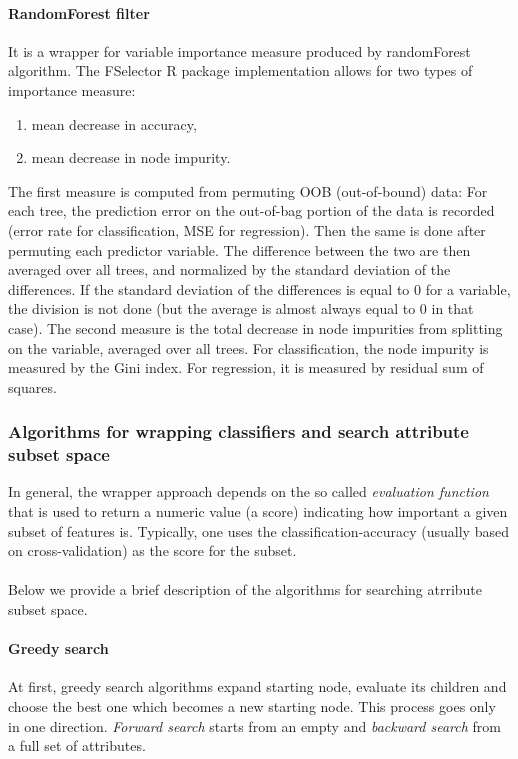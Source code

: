 \documentclass[10pt]{article}\usepackage[]{graphicx}\usepackage[]{color}
\begin{document}
\paragraph{RandomForest filter}
It is a wrapper for variable importance measure produced by randomForest algorithm. The FSelector R package implementation allows for two types of importance measure:
\begin{enumerate}
\item mean decrease in accuracy,
\item mean decrease in node impurity.
\end{enumerate}
The first measure is computed from
permuting OOB (out-of-bound) data: For each tree, the prediction error on the out-of-bag portion of the data is recorded (error rate for classification, MSE for regression). Then the same is done after permuting each predictor variable. The difference between the two are then averaged over all trees, and normalized by the standard deviation of the differences. If the standard deviation of the differences is equal to 0 for a variable, the division is not done (but the average is almost always equal to 0 in that case).
\newline
The second measure is the total decrease in node impurities from splitting on the variable, averaged over all trees. For classification, the node impurity is measured by the Gini index. For regression, it is measured by residual sum of squares.


\clearpage
\subsubsection{Algorithms for wrapping classifiers and search attribute subset space}
In general, the wrapper approach depends on the so called \textit{evaluation function} that is used to return a numeric value (a score) indicating how important a given subset of features is. Typically, one uses the classification-accuracy (usually based on cross-validation) as the score for the subset. 

\paragraph{}
Below we provide a brief description of the algorithms for searching atrribute subset space. 

\paragraph{Greedy search}
At first, greedy search algorithms expand starting node, evaluate its children and choose the best one which becomes a new starting node. This process goes only in one direction. \textit{Forward search} starts from an empty and \textit{backward search} from a full set of attributes.
\end{document}

